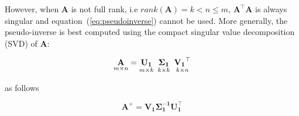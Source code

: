 %
%
%
%
%
%
%
%


However, when $\mathbf{A}$ is not full rank, i.e
$rank(\mathbf{A})=k <  n \leq m$, $\mathbf{A}^\top \mathbf{A}$ is
always singular and equation~(\ref{eq:pseudoinverse}) cannot be used.
More generally, the pseudo-inverse is best computed using the compact
singular value decomposition (SVD) of $\mathbf{A}$:

\begin{equation}
    \label{eq:compactsvd}
    \underset{m \times n}{\mathbf{A}}=
    \underset{m \times k}{\mathbf{U_1}} \enskip
    \underset{k \times k}{\mathbf{\Sigma_1}} \enskip
    \underset{k \times n}{\mathbf{V_1}^\top}
\end{equation}

\noindent as follows

\begin{equation}
\label{eq:pseudoinversesvd}
\mathbf{A}^+ = \mathbf{V_1\Sigma_1^{-1}U_1^\top}
\end{equation}


